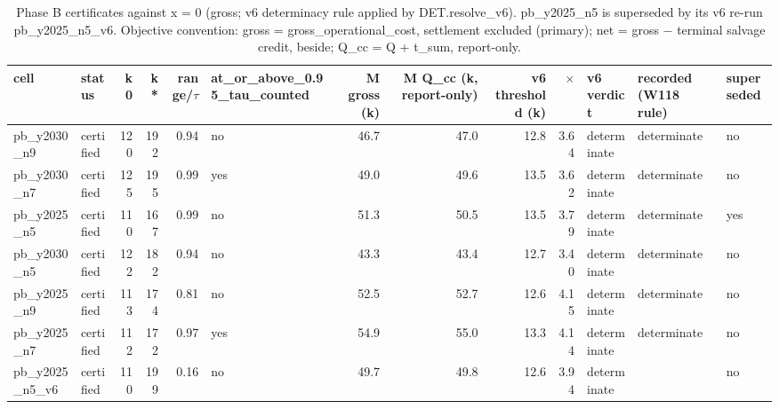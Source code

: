 \begin{table}[htbp]
\centering
\scriptsize
\caption{Phase B certificates against x = 0 (gross; v6 determinacy rule applied by DET.resolve\_v6). pb\_y2025\_n5 is superseded by its v6 re-run pb\_y2025\_n5\_v6. Objective convention: gross = gross\_operational\_cost, settlement excluded (primary); net = gross $-$ terminal salvage credit, beside; Q\_cc = Q + t\_sum, report-only.}
\label{tab:T5}
\begin{tabular}{llrrrlrrrrlll}
\toprule
cell & status & k0 & k* & range/$\tau$ & at\_or\_above\_0.95\_tau\_counted & M gross (k\texteuro{}) & M Q\_cc (k\texteuro{}, report-only) & v6 threshold (k\texteuro{}) & $\times$ & v6 verdict & recorded (W118 rule) & superseded \\
\midrule
pb\_y2030\_n9 & certified & 120 & 192 & 0.94 & no & 46.7 & 47.0 & 12.8 & 3.64 & determinate & determinate & no \\
pb\_y2030\_n7 & certified & 125 & 195 & 0.99 & yes & 49.0 & 49.6 & 13.5 & 3.62 & determinate & determinate & no \\
pb\_y2025\_n5 & certified & 110 & 167 & 0.99 & no & 51.3 & 50.5 & 13.5 & 3.79 & determinate & determinate & yes \\
pb\_y2030\_n5 & certified & 122 & 182 & 0.94 & no & 43.3 & 43.4 & 12.7 & 3.40 & determinate & determinate & no \\
pb\_y2025\_n9 & certified & 113 & 174 & 0.81 & no & 52.5 & 52.7 & 12.6 & 4.15 & determinate & determinate & no \\
pb\_y2025\_n7 & certified & 112 & 172 & 0.97 & yes & 54.9 & 55.0 & 13.3 & 4.14 & determinate & determinate & no \\
pb\_y2025\_n5\_v6 & certified & 110 & 199 & 0.16 & no & 49.7 & 49.8 & 12.6 & 3.94 & determinate &  & no \\
\bottomrule
\end{tabular}
\end{table}
